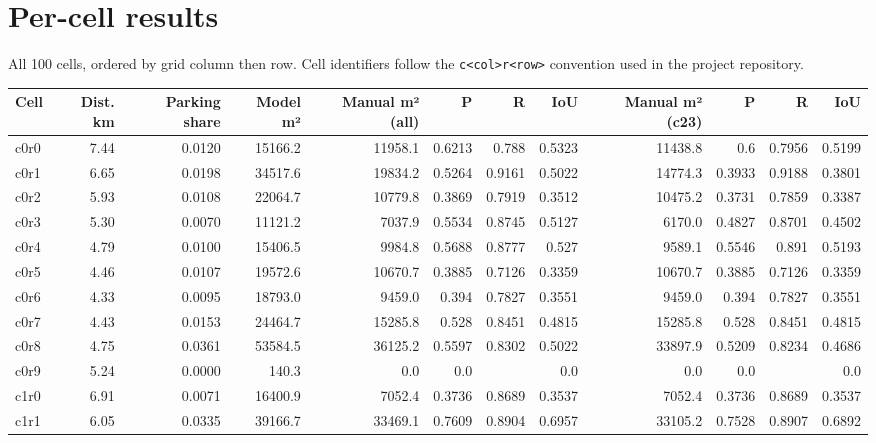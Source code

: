 \hypertarget{per-cell-results}{%
\section{Per-cell results}\label{per-cell-results}}

All 100 cells, ordered by grid column then row. Cell identifiers follow the \texttt{c\textless{}col\textgreater{}r\textless{}row\textgreater{}} convention used in the project repository.

\par\addvspace{\medskipamount}\noindent
\begin{landscape}
\begingroup\scriptsize
\begin{longtable}[]{@{}lrrrrrrrrrrr@{}}
\toprule
Cell & Dist. km & Parking share & Model m² & Manual m² (all) & P & R & IoU & Manual m² (c23) & P & R & IoU \\
\midrule
\endhead
c0r0 & 7.44 & 0.0120 & 15166.2 & 11958.1 & 0.6213 & 0.788 & 0.5323 & 11438.8 & 0.6 & 0.7956 & 0.5199 \\
c0r1 & 6.65 & 0.0198 & 34517.6 & 19834.2 & 0.5264 & 0.9161 & 0.5022 & 14774.3 & 0.3933 & 0.9188 & 0.3801 \\
c0r2 & 5.93 & 0.0108 & 22064.7 & 10779.8 & 0.3869 & 0.7919 & 0.3512 & 10475.2 & 0.3731 & 0.7859 & 0.3387 \\
c0r3 & 5.30 & 0.0070 & 11121.2 & 7037.9 & 0.5534 & 0.8745 & 0.5127 & 6170.0 & 0.4827 & 0.8701 & 0.4502 \\
c0r4 & 4.79 & 0.0100 & 15406.5 & 9984.8 & 0.5688 & 0.8777 & 0.527 & 9589.1 & 0.5546 & 0.891 & 0.5193 \\
c0r5 & 4.46 & 0.0107 & 19572.6 & 10670.7 & 0.3885 & 0.7126 & 0.3359 & 10670.7 & 0.3885 & 0.7126 & 0.3359 \\
c0r6 & 4.33 & 0.0095 & 18793.0 & 9459.0 & 0.394 & 0.7827 & 0.3551 & 9459.0 & 0.394 & 0.7827 & 0.3551 \\
c0r7 & 4.43 & 0.0153 & 24464.7 & 15285.8 & 0.528 & 0.8451 & 0.4815 & 15285.8 & 0.528 & 0.8451 & 0.4815 \\
c0r8 & 4.75 & 0.0361 & 53584.5 & 36125.2 & 0.5597 & 0.8302 & 0.5022 & 33897.9 & 0.5209 & 0.8234 & 0.4686 \\
c0r9 & 5.24 & 0.0000 & 140.3 & 0.0 & 0.0 & & 0.0 & 0.0 & 0.0 & & 0.0 \\
c1r0 & 6.91 & 0.0071 & 16400.9 & 7052.4 & 0.3736 & 0.8689 & 0.3537 & 7052.4 & 0.3736 & 0.8689 & 0.3537 \\
c1r1 & 6.05 & 0.0335 & 39166.7 & 33469.1 & 0.7609 & 0.8904 & 0.6957 & 33105.2 & 0.7528 & 0.8907 & 0.6892 \\

\end{longtable}
\end{landscape}

